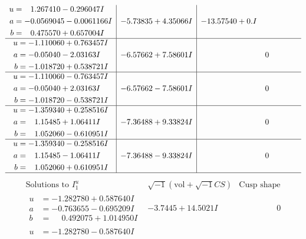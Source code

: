 \documentclass[1p]{elsarticle_modified}
\theoremstyle{definition}
\newcommand{\I}{\sqrt{-1}}
\begin{document}
$$\begin{array}{c|c|c}
\begin{aligned}
u &= \phantom{-}1.267410 - 0.296047 I \\
a &= -0.0569045 - 0.0061166 I \\
b &= \phantom{-}0.475570 + 0.657004 I\end{aligned}
 & -5.73835 + 4.35066 I & -13.57540 + 0. I\phantom{ +0.000000I} \\ \hline\begin{aligned}
u &= -1.110060 + 0.763457 I \\
a &= -0.05040 - 2.03163 I \\
b &= -1.018720 + 0.538721 I\end{aligned}
 & -6.57662 + 7.58601 I & \phantom{-0.000000 } 0 \\ \hline\begin{aligned}
u &= -1.110060 - 0.763457 I \\
a &= -0.05040 + 2.03163 I \\
b &= -1.018720 - 0.538721 I\end{aligned}
 & -6.57662 - 7.58601 I & \phantom{-0.000000 } 0 \\ \hline\begin{aligned}
u &= -1.359340 + 0.258516 I \\
a &= \phantom{-}1.15485 + 1.06411 I \\
b &= \phantom{-}1.052060 - 0.610951 I\end{aligned}
 & -7.36488 + 9.33824 I & \phantom{-0.000000 } 0 \\ \hline\begin{aligned}
u &= -1.359340 - 0.258516 I \\
a &= \phantom{-}1.15485 - 1.06411 I \\
b &= \phantom{-}1.052060 + 0.610951 I\end{aligned}
 & -7.36488 - 9.33824 I & \phantom{-0.000000 } 0\\
 \hline 
 \end{array}$$\newpage$$\begin{array}{c|c|c}  
\text{Solutions to }I^u_{1}& \I (\text{vol} + \sqrt{-1}CS) & \text{Cusp shape}\\
 \hline 
\begin{aligned}
u &= -1.282780 + 0.587640 I \\
a &= -0.763655 - 0.695209 I \\
b &= \phantom{-}0.492075 + 1.014950 I\end{aligned}
 & -3.7445 + 14.5021 I & \phantom{-0.000000 } 0 \\ \hline\begin{aligned}
u &= -1.282780 - 0.587640 I \\

\end{aligned}
\end{array}$$
\end{document}
